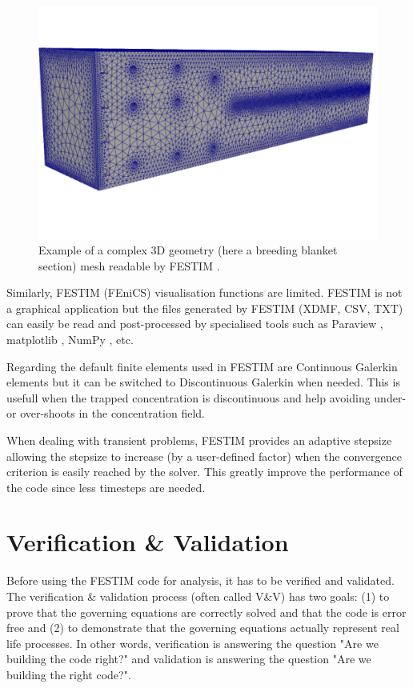 \begin{figure}
    \centering
    \includegraphics[width=0.5\linewidth]{Figures/Chapter2/example_mesh.png}
    \caption{Example of a complex 3D geometry (here a breeding blanket section) mesh readable by FESTIM \cite{dark_influence_2021}.}
    \label{fig: example mesh}
\end{figure}

Similarly, FESTIM (FEniCS) visualisation functions are limited.
FESTIM is not a graphical application but the files generated by FESTIM (XDMF, CSV, TXT) can easily be read and post-processed by specialised tools such as Paraview , matplotlib , NumPy , etc.

Regarding the default finite elements used in FESTIM are Continuous Galerkin elements but it can be switched to Discontinuous Galerkin when needed.
This is usefull when the trapped concentration is discontinuous and help avoiding under- or over-shoots in the concentration field.

When dealing with transient problems, FESTIM provides an adaptive stepsize allowing the stepsize to increase (by a user-defined factor) when the convergence criterion is easily reached by the solver.
This greatly improve the performance of the code since less timesteps are needed.



\section{Verification \& Validation}

Before using the FESTIM code for analysis, it has to be verified and validated.
The verification \& validation process (often called V\&V) has two goals: (1) to prove that the governing equations are correctly solved and that the code is error free and (2) to demonstrate that the governing equations actually represent real life processes.
In other words, verification is answering the question "Are we building the code right?" and validation is answering the question "Are we building the right code?".


